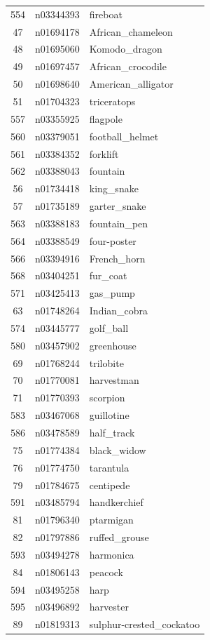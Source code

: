 \begin{table}
\begin{tabular}{cll}
554 & n03344393 & fireboat \\
47 & n01694178 & African_chameleon \\
48 & n01695060 & Komodo_dragon \\
49 & n01697457 & African_crocodile \\
50 & n01698640 & American_alligator \\
51 & n01704323 & triceratops \\
557 & n03355925 & flagpole \\
560 & n03379051 & football_helmet \\
561 & n03384352 & forklift \\
562 & n03388043 & fountain \\
56 & n01734418 & king_snake \\
57 & n01735189 & garter_snake \\
563 & n03388183 & fountain_pen \\
564 & n03388549 & four-poster \\
566 & n03394916 & French_horn \\
568 & n03404251 & fur_coat \\
571 & n03425413 & gas_pump \\
63 & n01748264 & Indian_cobra \\
574 & n03445777 & golf_ball \\
580 & n03457902 & greenhouse \\
69 & n01768244 & trilobite \\
70 & n01770081 & harvestman \\
71 & n01770393 & scorpion \\
583 & n03467068 & guillotine \\
586 & n03478589 & half_track \\
75 & n01774384 & black_widow \\
76 & n01774750 & tarantula \\
79 & n01784675 & centipede \\
591 & n03485794 & handkerchief \\
81 & n01796340 & ptarmigan \\
82 & n01797886 & ruffed_grouse \\
593 & n03494278 & harmonica \\
84 & n01806143 & peacock \\
594 & n03495258 & harp \\
595 & n03496892 & harvester \\
89 & n01819313 & sulphur-crested_cockatoo \\

\end{tabular}
\end{table}
